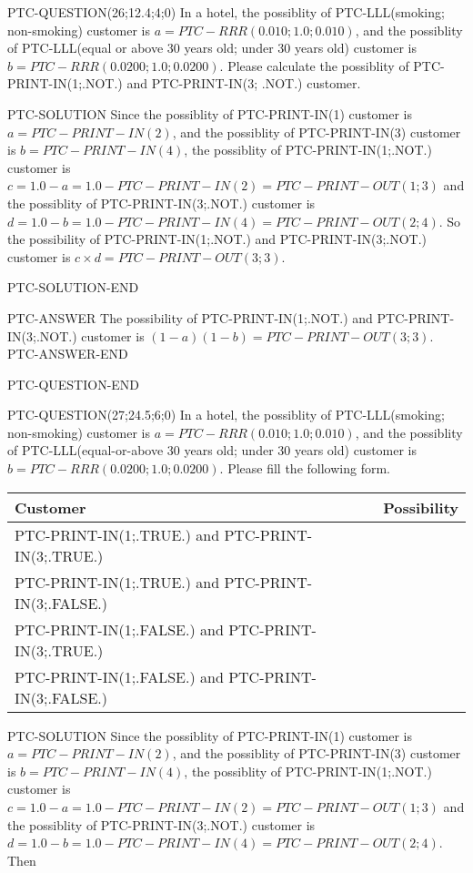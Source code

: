 \documentclass[12pt]{article}
\begin{document}
PTC-QUESTION(26;12.4;4;0)
In a hotel, the possiblity of PTC-LLL(smoking; non-smoking) customer is
$a = PTC-RRR(0.010;1.0;0.010)$, and the possiblity of PTC-LLL(equal or above 30
years old; under 30 years old) customer is $ b = PTC-RRR(0.0200;1.0;0.0200)$.
Please calculate the possiblity of PTC-PRINT-IN(1;.NOT.) and PTC-PRINT-IN(3;
.NOT.) customer.

PTC-SOLUTION
Since the possiblity of PTC-PRINT-IN(1) customer is $ a = PTC-PRINT-IN(2) $,
and the possiblity of PTC-PRINT-IN(3) customer is $ b = PTC-PRINT-IN(4) $,
the possiblity of PTC-PRINT-IN(1;.NOT.) customer is $ c = 1.0 - a = 1.0 -
PTC-PRINT-IN(2)
= PTC-PRINT-OUT(1;3) $ and the possiblity of PTC-PRINT-IN(3;.NOT.)
customer is $ d = 1.0 - b = 1.0 - PTC-PRINT-IN(4) = PTC-PRINT-OUT(2;4)  $.
So the possibility of PTC-PRINT-IN(1;.NOT.) and PTC-PRINT-IN(3;.NOT.)
customer is $ c \times d = PTC-PRINT-OUT(3;3) $.

PTC-SOLUTION-END

PTC-ANSWER
The possibility of PTC-PRINT-IN(1;.NOT.) and PTC-PRINT-IN(3;.NOT.)
customer is $ (1-a)(1-b) = PTC-PRINT-OUT(3;3) $.
PTC-ANSWER-END

\vspace{0.3in}
PTC-QUESTION-END



PTC-QUESTION(27;24.5;6;0)
In a hotel, the possiblity of PTC-LLL(smoking; non-smoking) customer is
$a = PTC-RRR(0.010;1.0;0.010)$, and the possiblity of PTC-LLL(equal-or-above 30
years old; under 30 years old) customer is $ b = PTC-RRR(0.0200;1.0;0.0200)$.
Please fill the following form.

\noindent
 \begin{tabular}{|l|l|}
 \hline
         Customer & Possibility \\
 \hline
   PTC-PRINT-IN(1;.TRUE.)  and  PTC-PRINT-IN(3;.TRUE.)  & \\
 \hline
   PTC-PRINT-IN(1;.TRUE.)  and  PTC-PRINT-IN(3;.FALSE.) & \\
 \hline
   PTC-PRINT-IN(1;.FALSE.) and  PTC-PRINT-IN(3;.TRUE.)  & \\
 \hline
   PTC-PRINT-IN(1;.FALSE.) and PTC-PRINT-IN(3;.FALSE.) & \\
 \hline
 \end{tabular}



PTC-SOLUTION
Since the possiblity of PTC-PRINT-IN(1) customer is $ a = PTC-PRINT-IN(2) $,
and the possiblity of PTC-PRINT-IN(3) customer is $ b = PTC-PRINT-IN(4) $,
the possiblity of PTC-PRINT-IN(1;.NOT.) customer is $ c = 1.0 - a = 1.0 -
PTC-PRINT-IN(2)
= PTC-PRINT-OUT(1;3) $ and the possiblity of PTC-PRINT-IN(3;.NOT.)
customer is $ d = 1.0 - b = 1.0 - PTC-PRINT-IN(4) = PTC-PRINT-OUT(2;4)  $.
Then
\end{document}
